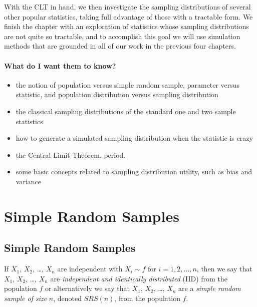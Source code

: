 \documentclass[captions=tableheading]{scrbook}
\begin{document}
With the CLT in hand, we then investigate the sampling distributions of several other popular statistics, taking full advantage of those with a tractable form. We finish the chapter with an exploration of statistics whose sampling distributions are not quite so tractable, and to accomplish this goal we will use simulation methods that are grounded in all of our work in the previous four chapters.

\paragraph*{What do I want them to know?}

\begin{itemize}
\item the notion of population versus simple random sample, parameter versus statistic, and population distribution versus sampling distribution
\item the classical sampling distributions of the standard one and two sample statistics
\item how to generate a simulated sampling distribution when the statistic is crazy
\item the Central Limit Theorem, period.
\item some basic concepts related to sampling distribution utility, such as bias and variance
\end{itemize}
\section{Simple Random Samples}
\label{sec-8-1}

\label{sec:simple-random-samples}
\subsection{Simple Random Samples}
\label{sec-8-1-1}

\label{sub:simple-random-samples}

\begin{defn}
If \(X_{1}\), \(X_{2}\), \ldots{}, \(X_{n}\) are independent with \(X_{i}\sim f\) for \(i=1,2,\ldots,n\), then we say that \(X_{1}\), \(X_{2}\), \ldots{}, \(X_{n}\) are \emph{independent and identically distributed} (IID) from the population \(f\) or alternatively we say that \(X_{1}\), \(X_{2}\), \ldots{}, \(X_{n}\) are a \emph{simple random sample of size} \(n\), denoted \(SRS(n)\), from the population \(f\). 
\end{defn}
\end{document}
